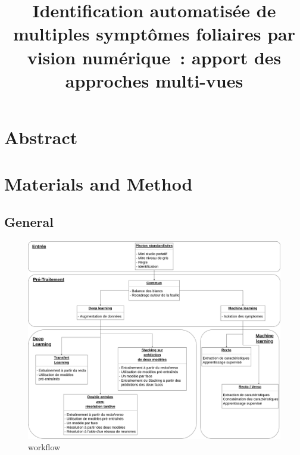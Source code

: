 \documentclass[english]{article}
\title{Identification automatisée de multiples symptômes foliaires par vision numérique : apport des approches multi-vues}
\begin{document}
\maketitle

\tableofcontents

\section{Abstract}

\section{Materials and Method}

\subsection{General}
	\begin{figure}[!htbp]
		\includegraphics[scale=0.2]{images/ml_dl_process.png}
		\caption{workflow}
		\label{fig:workflow}
	\end{figure}
	\FloatBarrier
	
\end{document}
